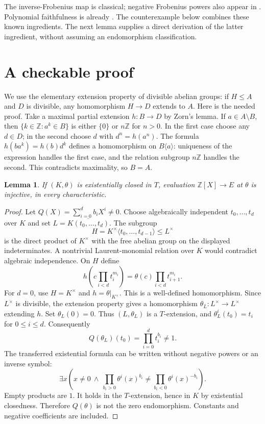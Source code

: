 \documentclass[11pt,a4paper]{article}
\newtheorem{lemma}[theorem]{Lemma}
\newcommand{\Z}{\mathbb Z}
\begin{document}
The inverse-Frobenius map is classical; negative Frobenius powers also
appear in \cite[Proposition 1.14]{de19}. Polynomial faithfulness is
already \cite[Corollary 5.7]{de25}. The counterexample below combines
these known ingredients. The next lemma supplies a direct derivation of
the latter ingredient, without assuming an endomorphism classification.

\section{A checkable proof}
We use the elementary extension property of divisible abelian groups:
if $H\leq A$ and $D$ is divisible, any homomorphism $H\to D$ extends
to $A$. Here is the needed proof. Take a maximal partial extension
$h:B\to D$ by Zorn's lemma. If $a\in A\setminus B$, then
$\{k\in\Z:a^k\in B\}$ is either $\{0\}$ or $n\Z$ for $n>0$.
In the first case choose any $d\in D$; in the second choose $d$ with
$d^n=h(a^n)$. The formula $h(ba^k)=h(b)d^k$ defines a homomorphism
on $B\langle a\rangle$: uniqueness of the expression handles the first
case, and the relation subgroup $n\Z$ handles the second.
This contradicts maximality, so $B=A$.

\begin{lemma}\label{lem:faithful}
If $(K,\theta)$ is existentially closed in $T$, evaluation
$\Z[X]\to E$ at $\theta$ is injective, in every characteristic.
\end{lemma}
\begin{proof}
Let $Q(X)=\sum_{i=0}^d b_iX^i\ne0$.
Choose algebraically independent $t_0,\ldots,t_d$ over $K$ and set
$L=\overline{K(t_0,\ldots,t_d)}$.
The subgroup
\[
 H=K^\times\langle t_0,\ldots,t_{d-1}\rangle\leq L^\times
\]
is the direct product of $K^\times$ with the free abelian group on the
displayed indeterminates. A nontrivial Laurent-monomial relation over
$K$ would contradict algebraic independence. On $H$ define
\[
 h\left(c\prod_{i<d}t_i^{m_i}\right)
       =\theta(c)\prod_{i<d}t_{i+1}^{m_i}.
\]
For $d=0$, use $H=K^\times$ and $h=\theta|_{K^\times}$.
This is a well-defined homomorphism. Since $L^\times$ is divisible,
the extension property gives a homomorphism $\theta_L:L^\times\to
L^\times$ extending $h$. Set $\theta_L(0)=0$.
Thus $(L,\theta_L)$ is a $T$-extension, and
$\theta_L^i(t_0)=t_i$ for $0\leq i\leq d$. Consequently
\[
 Q(\theta_L)(t_0)=\prod_{i=0}^d t_i^{b_i}\ne1.
\]
The transferred existential formula can be written without negative
powers or an inverse symbol:
\[
 \exists x\left(x\ne0\ \wedge\
 \prod_{b_i>0}\theta^i(x)^{b_i}\ne
 \prod_{b_i<0}\theta^i(x)^{-b_i}\right).
\]
Empty products are $1$. It holds in the $T$-extension, hence in $K$
by existential closedness. Therefore $Q(\theta)$ is not the zero
endomorphism. Constants and negative coefficients are included.
\end{proof}
\end{document}
